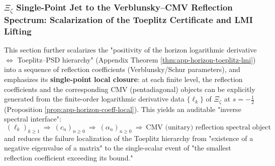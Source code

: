 \subsubsection{\texorpdfstring{$\Xi_\zeta$}{Xi\_zeta} Single-Point Jet to the Verblunsky--CMV Reflection Spectrum: Scalarization of the Toeplitz Certificate and LMI Lifting}\label{subsubsec:xi-verblunsky-cmv-from-local-jet}
This section further scalarizes the "positivity of the horizon logarithmic derivative \(\Leftrightarrow\) Toeplitz--PSD hierarchy" (Appendix Theorem \ref{thm:app-horizon-toeplitz-lmi}) into a sequence of reflection coefficients (Verblunsky/Schur parameters), and emphasizes its \textbf{single-point local closure}: at each finite level, the reflection coefficients and the corresponding CMV (pentadiagonal) objects can be explicitly generated from the finite-order logarithmic derivative data \(\{\ell_k\}\) of \(\Xi_\zeta\) at \(s=-\tfrac12\) (Proposition \ref{prop:app-horizon-coeff-local}).
This yields an auditable "inverse spectral interface":
\[
\boxed{\;
(\ell_k)_{k\ge 1}\ \Longrightarrow\ (c_n)_{n\ge 0}\ \Longrightarrow\ (\alpha_n)_{n\ge 0}
\ \Longrightarrow\
\text{CMV (unitary) reflection spectral object}\;}
\]
and reduces the failure localization of the Toeplitz hierarchy from "existence of a negative eigenvalue of a matrix" to the single-scalar event of "the smallest reflection coefficient exceeding its bound."

